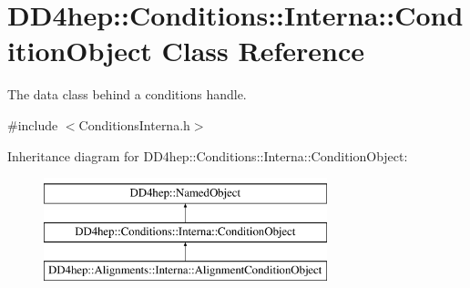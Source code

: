 \hypertarget{class_d_d4hep_1_1_conditions_1_1_interna_1_1_condition_object}{}\section{D\+D4hep\+:\+:Conditions\+:\+:Interna\+:\+:Condition\+Object Class Reference}
\label{class_d_d4hep_1_1_conditions_1_1_interna_1_1_condition_object}


The data class behind a conditions handle.  




{\ttfamily \#include $<$Conditions\+Interna.\+h$>$}

Inheritance diagram for D\+D4hep\+:\+:Conditions\+:\+:Interna\+:\+:Condition\+Object\+:\begin{figure}[H]
\begin{center}
\leavevmode
\includegraphics[height=3.000000cm]{class_d_d4hep_1_1_conditions_1_1_interna_1_1_condition_object}
\end{center}
\end{figure}
